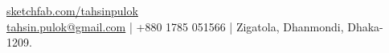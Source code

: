   {\href{https://sketchfab.com/tahsinpulok}{sketchfab.com/tahsinpulok}\\
  \href{mailto:tahsin.pulok@gmail.com}{tahsin.pulok@gmail.com} | +880 1785 051566 | Zigatola, Dhanmondi, Dhaka- 1209.}
\sectionsep
